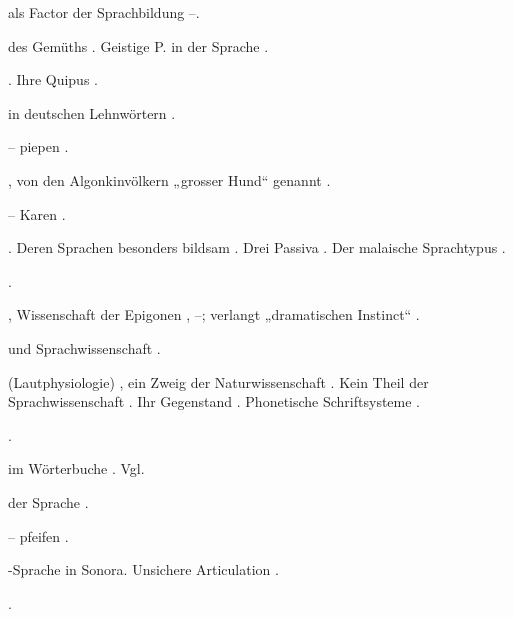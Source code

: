 \begin{register}
 als Factor der Sprachbildung \pageref{sp.315}–\pageref{sp.317}.

 des Gemüths \pageref{sp.307}. Geistige P. in der Sprache \pageref{sp.325}.

. Ihre Quipus \pageref{sp.128}.


 in deutschen Lehnwörtern \pageref{sp.186}.

 – piepen \pageref{sp.208}.

, von den Algonkinvölkern „grosser Hund“ genannt \pageref{sp.41}.

 – Karen \pageref{sp.201}.

 \pageref{sp.147}. Deren Sprachen besonders bildsam \pageref{sp.349}. Drei Passiva \pageref{sp.363}. Der malaische Sprachtypus \pageref{sp.415}.

 \pageref{sp.233}.

, Wissenschaft der Epigonen \pageref{sp.21}, \pageref{sp.24}–\pageref{sp.25}; verlangt „dramatischen Instinct“ \pageref{sp.52}.

 und Sprachwissenschaft \pageref{sp.14}.

 (Lautphysiologie) \sed{\pageref{sp.5}}, ein Zweig der Naturwissenschaft \pageref{sp.14}. Kein Theil der Sprachwissenschaft \pageref{sp.33}. Ihr Gegenstand \pageref{sp.33}. Phonetische Schriftsysteme \pageref{sp.38}. 

 \pageref{sp.130}.


 im Wörterbuche \pageref{sp.124}.  Vgl. 

 der Sprache \pageref{sp.17}. 



 – pfeifen \pageref{sp.208}.

-Sprache in Sonora. Unsichere Articulation \pageref{sp.194}.

 \pageref{sp.264}.


\end{register}
